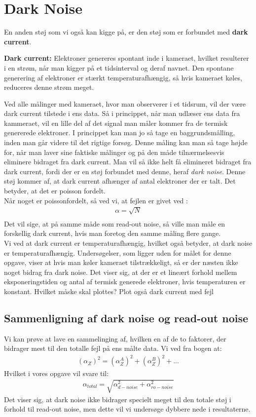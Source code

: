 \documentclass[working]{tuftebook}
\begin{document}
\section{Dark Noise}
En anden støj som vi også kan kigge på, er den støj som er forbundet med \textbf{dark current}.
\begin{marginfigure}
\textbf{Dark current:} Elektroner genereres spontant inde i kameraet, hvilket resulterer i en strøm, når man kigger på et tidsinterval og deraf navnet. Den spontane generering af elektroner er stærkt temperaturafhængig, så hvis kameraet køles, reduceres denne strøm meget.

\end{marginfigure}
Ved alle målinger med kameraet, hvor man observerer i et tidsrum, vil der være dark current tilstede i ens data. Så i princippet, når man udlæser ens data fra kammeraet, vil en lille del af det signal man måler kommer fra de termisk genererede elektroner. I princippet kan man jo så tage en baggrundsmålling, inden man går videre til det rigtige forsøg. Denne måling kan man så tage højde for, når man laver sine faktiske målinger og på den måde tilnærmelsesvis eliminere bidraget fra dark current. Man vil så ikke helt få elimineret bidraget fra dark current, fordi der er en støj forbundet med denne, heraf \textit{dark noise}. Denne støj kommer af, at dark current afhænger af antal elektroner der er talt. Det betyder, at det er poisson fordelt. 
\\
Når noget er poissonfordelt, så ved vi, at fejlen er givet ved :
\begin{align*}
\alpha = \sqrt{N} \\
\end{align*}
Det vil sige, at på samme måde som read-out noise, så ville man måle en forskellig dark current, hvis man foretog den samme måling flere gange. 
\\
Vi ved at dark current er temperaturafhængig, hvilket også betyder, at dark noise er temperaturafhængig. Undersøgelser, som ligger uden for målet for denne opgave, viser at hvis man køler kameraet tilstrækkeligt, så er der næsten ikke noget bidrag fra dark noise. Det viser sig, at der er et lineært forhold mellem eksponeringstiden og antal af termisk generede elektroner, hvis temperaturen er konstant. Hvilket måske skal plottes? Plot også dark current med fejl
\subsection{Sammenligning af dark noise og read-out noise}
Vi kan prøve at lave en sammelinging af, hvilken en af de to faktorer, der bidrager mest til den totalle fejl på ens målte data. Vi ved fra bogen  at: 
\begin{align*}
(\alpha_Z)^2 =(\alpha_Z^A)^2+(\alpha_Z^B)^2 + ...
\end{align*}
Hvilket i vores opgave vil svare til:
\begin{align*}
\alpha_{total} = \sqrt{\alpha_{d-noise}^2 + \alpha_{ro-noise}^2} 
\end{align*}
Det viser sig, at dark noise ikke bidrager specielt meget til den totale støj i forhold til read-out noise, men dette vil vi undersøge dybbere nede i resultaterne.
\end{document}

